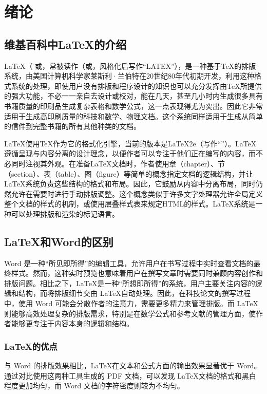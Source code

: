 \section{绪论}
\subsection{维基百科中\LaTeX 的介绍}
\LaTeX （
或，常被读作（或，风格化后写作“LATEX”），是一种基于\TeX 的排版系统，由美国计算机科学家莱斯利·兰伯特在20世纪80年代初期开发，利用这种格式系统的处理，即使用户没有排版和程序设计的知识也可以充分发挥由\TeX 所提供的强大功能，不必一一亲自去设计或校对，能在几天，甚至几小时内生成很多具有书籍质量的印刷品生成复杂表格和数学公式，这一点表现得尤为突出。因此它非常适用于生成高印刷质量的科技和数学、物理文档。这个系统同样适用于生成从简单的信件到完整书籍的所有其他种类的文档。

LaTeX使用\TeX 作为它的格式化引擎，当前的版本是LaTeX2e（写作“\LaTeXe”）。LaTeX遵循呈现与内容分离的设计理念，以便作者可以专注于他们正在编写的内容，而不必同时注视其外观。在准备LaTeX文档时，作者使用章（chapter）、节（section）、表（table）、图（figure）等简单的概念指定文档的逻辑结构，并让LaTeX系统负责这些结构的格式和布局。因此，它鼓励从内容中分离布局，同时仍然允许在需要时进行手动排版调整。这个概念类似于许多文字处理器允许全局定义整个文档的样式的机制，或使用层叠样式表来规定HTML的样式。LaTeX系统是一种可以处理排版和渲染的标记语言。\textsuperscript{\cite{url1}}

\subsection{\LaTeX 和Word的区别}
Word 是一种“所见即所得”的编辑工具，允许用户在书写过程中实时查看文档的最终样式。然而，这种实时预览也意味着用户在撰写文章时需要同时兼顾内容创作和排版问题。相比之下，\LaTeX 是一种“所想即所得”的系统，用户主要关注内容的逻辑和结构，而将排版细节交由 \LaTeX 自动处理。因此，在科技论文的撰写过程中，使用 Word 可能会分散作者的注意力，需要更多精力来管理排版。而 \LaTeX 则能够高效处理复杂的排版需求，特别是在数学公式和参考文献的管理方面，使作者能够更专注于内容本身的逻辑和结构。\textsuperscript{\cite{url2}}
\subsubsection{\LaTeX 的优点}
与 Word 的排版效果相比，\LaTeX 在文本和公式方面的输出效果显著优于 Word。通过对比使用这两种工具生成的 PDF 文档，可以发现 \LaTeX 文档的格式和黑白程度更加均匀，而 Word 文档的字符密度则较为不均匀。

